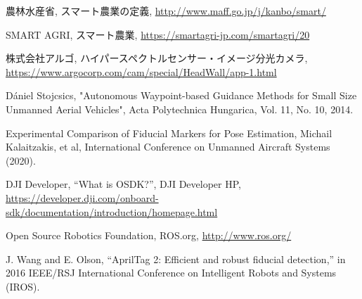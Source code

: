 \documentclass[a4j,fleqn,dvipdfmx,uplatex]{jsarticle}
\begin{document}
\begin{thebibliography}{99}

農林水産省, スマート農業の定義, \url{http://www.maff.go.jp/j/kanbo/smart/}\vspace{2mm}

SMART AGRI, スマート農業, \url{https://smartagri-jp.com/smartagri/20}\vspace{2mm}

株式会社アルゴ, ハイパースペクトルセンサー・イメージ分光カメラ, \url{https://www.argocorp.com/cam/special/HeadWall/app-1.html}\vspace{2mm}

Dániel Stojcsics, "Autonomous Waypoint-based Guidance Methods for Small Size Unmanned Aerial Vehicles", Acta Polytechnica Hungarica, Vol. 11, No. 10, 2014.\vspace{2mm}

Experimental Comparison of Fiducial Markers for Pose Estimation, 
Michail Kalaitzakis, et al, International Conference on Unmanned Aircraft Systems (2020).\vspace{2mm}

DJI Developer, “What is OSDK?”, DJI Developer HP, 
\url{https://developer.dji.com/onboard-sdk/documentation/introduction/homepage.html}\vspace{2mm}

Open Source Robotics Foundation, ROS.org, 
\url{http://www.ros.org/}\vspace{2mm}


J. Wang and E. Olson, “AprilTag 2: Efficient and robust fiducial detection,”
in 2016 IEEE/RSJ International Conference on Intelligent Robots and Systems (IROS).\vspace{2mm}
    



\end{thebibliography}
\end{document}
